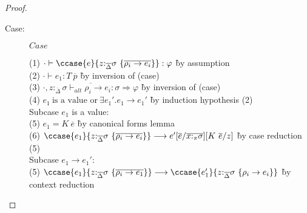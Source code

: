 \begin{proof}
\begin{description}
\item[Case:] $Case$
\begin{tabbing}
(1) $\cdot \vdash \ccase{e}{z{:}_{\overline{\Delta}}\sigma~\{\overline{\rho_i \to e_i}\}} : \varphi$ \` by assumption \\
(2) $\cdot \vdash e_1 : T~\overline{p}$ \` by inversion of (case) \\
(3) $\overline{\cdot, z{:}_{\overline{\Delta}}\sigma \vdash_{alt} \rho_i\to e_i : \sigma \Longrightarrow \varphi}$ \` by inversion of (case) \\
(4) $e_1~\textrm{is a value or}~\exists e_1'. e_1 \longrightarrow e_1'$ \` by induction hypothesis (2) \\
\textrm{Subcase $e_1$ is a value:}\\
(5) $e_1 = K~\overline{e}$ \` by canonical forms lemma \\
(6) $\ccase{e_1}{z{:}_{\overline{\Delta}}\sigma~\{\overline{\rho_i \to e_i}\}} \longrightarrow e'[\overline{e}/\overline{x{:}_\pi\sigma}][K~\overline{e}/z]$ \` by case reduction (5) \\
\textrm{Subcase $e_1 \to e_1'$:}\\
(5) $\ccase{e_1}{z{:}_{\overline{\Delta}}\sigma~\{\overline{\rho_i \to e_1}\}} \longrightarrow \ccase{e_1'}{z{:}_{\overline{\Delta}}\sigma~\{\rho_i \to e_i\}}$ \` by context reduction \\
\end{tabbing}

\end{description}

\end{proof}

